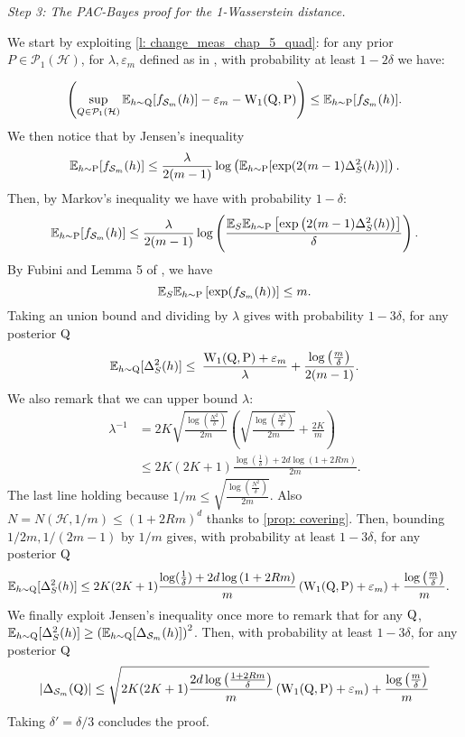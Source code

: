 \begin{noaddcontents}
\textit{Step 3: The PAC-Bayes proof for the 1-Wasserstein distance.}

We start by exploiting \cref{l: change_meas_chap_5_quad}: for any prior $P\in\mathcal{P}_1(\mathcal{H})$, for $\lambda, \varepsilon_m$ defined as in , with probability at least $1-2\delta$ we have:

\[ \left(\sup_{Q\in \mathcal{P}_1(\mathcal{H})} \mathbb{E}_{h\sim \mathrm{Q}}[ f_{\mathcal{S}_m}(h)] - \varepsilon_m - \mathrm{W}_{1}(\mathrm{Q},\mathrm{P}) \right) \leq \mathbb{E}_{h\sim \mathrm{P}}[ f_{\mathcal{S}_m}(h)]. \]
We then notice that by Jensen's inequality
$$\mathbb{E}_{h\sim \mathrm{P}}[ f_{\mathcal{S}_m}(h)] \leq \frac{\lambda}{2(m-1)}\log\left(\mathbb{E}_{h\sim \mathrm{P}}[ \exp(2(m-1)\Delta_S^2(h))]    \right).$$
Then, by Markov's inequality we have with probability $1-\delta$:
\[ \mathbb{E}_{h\sim \mathrm{P}}[ f_{\mathcal{S}_m}(h)] \leq \frac{\lambda}{2(m-1)} \log\left(\frac{\mathbb{E}_S\mathbb{E}_{h\sim \mathrm{P}}\left[ \exp\left(2(m-1)\Delta_S^2(h)\right) \right]}{\delta}\right).  \]
By Fubini and Lemma 5 of \citet{mcallester2003simplified}, we have
\[ \mathbb{E}_S\mathbb{E}_{h\sim \mathrm{P}}\left[ \exp(f_{\mathcal{S}_m}(h))\right] \leq m. \]
Taking an union bound and dividing by $\lambda$ gives with probability $1-3\delta$, for any posterior $\mathrm{Q}$
\[ \mathbb{E}_{h\sim \mathrm{Q}}[\Delta_S^2(h)] \leq \frac{}{}  \frac{\mathrm{W}_{1}(\mathrm{Q},\mathrm{P})+\varepsilon_m}{\lambda} + \frac{\log\left( \frac{m}{\delta} \right)}{2(m-1)}.   \]
We also remark that we can upper bound $\lambda$:
\begin{align*}
\lambda^{-1} & =  2K\sqrt{\frac{\log(\frac{N^2}{\delta})}{2m}}\left(\sqrt{\frac{\log(\frac{N^2}{\delta})}{2m}} + \frac{2K}{m} \right)\\
& \leq 2K(2K+1)\frac{\log(\frac{1}{\delta}) + 2d\log\left(1 +2Rm \right)}{2m}.
\end{align*}
The last line holding because $1/m \leq \sqrt{\frac{\log(\frac{N^2}{\delta})}{2m}}$. Also $N= N(\mathcal{H},1/m) \leq (1+2Rm)^d$ thanks to \cref{prop: covering}.
Then, bounding $1/2m, 1/(2m-1)$ by $1/m$ gives, with probability at least $1-3\delta$, for any posterior $\mathrm{Q}$
\begin{align*}
\mathbb{E}_{h\sim \mathrm{Q}}[\Delta_S^2(h)] & \leq  2K(2K+1) \frac{\log(\frac{1}{\delta}) + 2d\log\left(1 +2Rm \right)}{m} \left(\mathrm{W}_{1}(\mathrm{Q},\mathrm{P})+\varepsilon_m \right) + \frac{\log\left( \frac{m}{\delta} \right)}{m}.
\end{align*}
We finally exploit Jensen's inequality once more to remark that for any $\mathrm{Q}$, $\mathbb{E}_{h\sim \mathrm{Q}}[\Delta_S^2(h)] \geq \left(\mathbb{E}_{h\sim \mathrm{Q}}[\Delta_{\mathcal{S}_m}(h)]  \right)^2$.
Then, with probability at least $1-3\delta$, for any posterior $\mathrm{Q}$
\[ |\Delta_{\mathcal{S}_m}(\mathrm{Q})| \leq \sqrt{2K(2K+1)\frac{2d\log\left(\frac{1 +2Rm }{\delta}\right)}{m} \left(\mathrm{W}_{1}(\mathrm{Q},\mathrm{P})+\varepsilon_m \right) + \frac{\log\left( \frac{m}{\delta} \right)}{m}   } \]
Taking $\delta'= \delta/3$ concludes the proof.


\end{noaddcontents}
